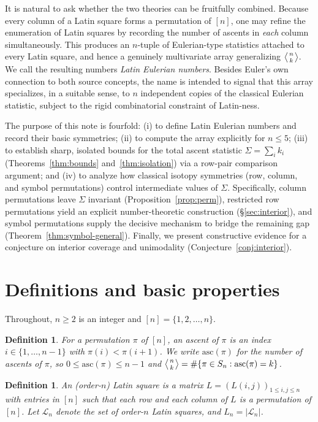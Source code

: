 \documentclass[11pt]{amsart}
\newtheorem{definition}[theorem]{Definition}
\newcommand{\EN}[1]{\left\langle #1 \right\rangle}
\begin{document}
It is natural to ask whether the two theories can be fruitfully combined. Because every column of a Latin square forms a permutation of $[n]$, one may refine the enumeration of Latin squares by recording the number of ascents in \emph{each} column simultaneously. This produces an $n$-tuple of Eulerian-type statistics attached to every Latin square, and hence a genuinely multivariate array generalizing $\EN{n\atop k}$. We call the resulting numbers \emph{Latin Eulerian numbers}. Besides Euler's own connection to both source concepts, the name is intended to signal that this array specializes, in a suitable sense, to $n$ independent copies of the classical Eulerian statistic, subject to the rigid combinatorial constraint of Latin-ness.

The purpose of this note is fourfold: (i) to define Latin Eulerian numbers and record their basic symmetries; (ii) to compute the array explicitly for $n \le 5$; (iii) to establish sharp, isolated bounds for the total ascent statistic $\Sigma = \sum_i k_i$ (Theorems~\ref{thm:bounds} and~\ref{thm:isolation}) via a row-pair comparison argument; and (iv) to analyze how classical isotopy symmetries (row, column, and symbol permutations) control intermediate values of $\Sigma$. Specifically, column permutations leave $\Sigma$ invariant (Proposition~\ref{prop:perm}), restricted row permutations yield an explicit number-theoretic construction (\S\ref{sec:interior}), and symbol permutations supply the decisive mechanism to bridge the remaining gap (Theorem~\ref{thm:symbol-general}). Finally, we present constructive evidence for a conjecture on interior coverage and unimodality (Conjecture~\ref{conj:interior}).
\section{Definitions and basic properties}

Throughout, $n\ge 2$ is an integer and $[n]=\{1,2,\dots,n\}$.

\begin{definition}
For a permutation $\pi$ of $[n]$, an \emph{ascent} of $\pi$ is an index $i\in\{1,\dots,n-1\}$ with $\pi(i)<\pi(i+1)$. We write $\mathrm{asc}(\pi)$ for the number of ascents of $\pi$, so $0\le \mathrm{asc}(\pi)\le n-1$ and $\EN{n\atop k}=\#\{\pi\in S_n:\mathrm{asc}(\pi)=k\}$.
\end{definition}

\begin{definition}
An (order-$n$) \emph{Latin square} is a matrix $L=(L(i,j))_{1\le i,j\le n}$ with entries in $[n]$ such that each row and each column of $L$ is a permutation of $[n]$. Let $\mathcal L_n$ denote the set of order-$n$ Latin squares, and $L_n=|\mathcal L_n|$.
\end{definition}
\end{document}
